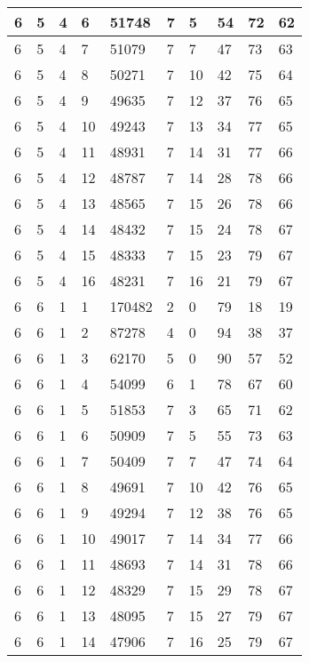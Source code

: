 \begin{table}[!ht]
\begin{tabular}{|l|l|l|l|l|l|l|l|l|l|}
        6 & 5 & 4 & 6 & 51748 & 7 & 5 & 54 & 72 & 62 \\ \hline
        6 & 5 & 4 & 7 & 51079 & 7 & 7 & 47 & 73 & 63 \\ \hline
        6 & 5 & 4 & 8 & 50271 & 7 & 10 & 42 & 75 & 64 \\ \hline
        6 & 5 & 4 & 9 & 49635 & 7 & 12 & 37 & 76 & 65 \\ \hline
        6 & 5 & 4 & 10 & 49243 & 7 & 13 & 34 & 77 & 65 \\ \hline
        6 & 5 & 4 & 11 & 48931 & 7 & 14 & 31 & 77 & 66 \\ \hline
        6 & 5 & 4 & 12 & 48787 & 7 & 14 & 28 & 78 & 66 \\ \hline
        6 & 5 & 4 & 13 & 48565 & 7 & 15 & 26 & 78 & 66 \\ \hline
        6 & 5 & 4 & 14 & 48432 & 7 & 15 & 24 & 78 & 67 \\ \hline
        6 & 5 & 4 & 15 & 48333 & 7 & 15 & 23 & 79 & 67 \\ \hline
        6 & 5 & 4 & 16 & 48231 & 7 & 16 & 21 & 79 & 67 \\ \hline
        6 & 6 & 1 & 1 & 170482 & 2 & 0 & 79 & 18 & 19 \\ \hline
        6 & 6 & 1 & 2 & 87278 & 4 & 0 & 94 & 38 & 37 \\ \hline
        6 & 6 & 1 & 3 & 62170 & 5 & 0 & 90 & 57 & 52 \\ \hline
        6 & 6 & 1 & 4 & 54099 & 6 & 1 & 78 & 67 & 60 \\ \hline
        6 & 6 & 1 & 5 & 51853 & 7 & 3 & 65 & 71 & 62 \\ \hline
        6 & 6 & 1 & 6 & 50909 & 7 & 5 & 55 & 73 & 63 \\ \hline
        6 & 6 & 1 & 7 & 50409 & 7 & 7 & 47 & 74 & 64 \\ \hline
        6 & 6 & 1 & 8 & 49691 & 7 & 10 & 42 & 76 & 65 \\ \hline
        6 & 6 & 1 & 9 & 49294 & 7 & 12 & 38 & 76 & 65 \\ \hline
        6 & 6 & 1 & 10 & 49017 & 7 & 14 & 34 & 77 & 66 \\ \hline
        6 & 6 & 1 & 11 & 48693 & 7 & 14 & 31 & 78 & 66 \\ \hline
        6 & 6 & 1 & 12 & 48329 & 7 & 15 & 29 & 78 & 67 \\ \hline
        6 & 6 & 1 & 13 & 48095 & 7 & 15 & 27 & 79 & 67 \\ \hline
        6 & 6 & 1 & 14 & 47906 & 7 & 16 & 25 & 79 & 67 \\ \hline

\end{tabular}
\end{table}

